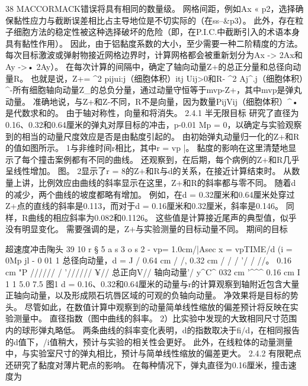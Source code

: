 \documentclass[UTF8,11pt,a4paper,openany,fontset=fandol]{ctexbook}
\begin{document}
38 MACCORMACK错误将具有相同的数量级。 网格间距，例如Ax « p2，选择确保黏性应力与截断误差相比占主导地位是不切实际的（在ss--\&p3）。 此外，存在粒子细胞方法的稳定性被这种选择破坏的危险（即，在P.I.C.中截断引入的术语本身具有黏性作用）。 因此，由于铝黏度系数的大小，至少需要一种二阶精度的方法。 每次目标激波或弹射物接近网格边界时，计算网格都会被重新划分为Ax -> 2Ax和Ay ->• 2Ay）。 在每次计算的间隔中，确定了轴向动量Z+的总正分量和总径向动量R。 也就是说，Z+= \textasciicircum{}2 pijui:j（细胞体积）itj Uij>0和R- \textasciicircum{}2 Aj\textasciicircum{}.j（细胞体积）\textasciicircum{}-所有细胞轴向动量Z\_的总负分量，通过动量守恒等于mvp-Z+，其中mvp是弹丸动量。 准确地说，与Z+和Z-不同，R不是向量，因为数量PijVij（细胞体积）\textasciicircum{}•是代数求和的。 由于轴对称性，向量和将消失。 2.4.1 半无限目标 研究了直径为0.16、0.32和0.64厘米的弹丸对厚目标的冲击，p-0.01 Mp = 0，以确定与实验观察到的相当的动量尺度效应是否是由黏度引起的。 由初始弹丸动量归一化的Z+和R的值如图所示。 1与非维时间r相比，其中r = vp |。 黏度的影响在这里清楚地显示了每个撞击案例都有不同的曲线。 还观察到，在后期，每个病例的Z+和R几乎呈线性增加。 图。 2显示了r = 8的Z+和R与d的关系，在接近计算结束时。 从数量上讲，比例效应由曲线的斜率显示在这里，Z+和R的斜率都与零不同。 随着d的减少，两个曲线的坡度都略有增加。 例如，在d = 0.32厘米和0.64厘米处穿过Z+点的直线的斜率是0.113，而对于d = 0.16厘米和0.32厘米，斜率是0.146。 同样，R曲线的相应斜率为0.082和0.1126。 这些值是计算接近尾声的典型值，似乎没有明显变化。 需要强调的是，Z+与实验测量的目标动量不同。 期间的目标

超速度冲击陱头 39 10 r § 5 a s 3 o s 2 - vp= 1.0cm/|Asec x = vpTIME/d (i = 0Mp jl - 0 01 1 总径向动量，d = J / 0.64 cm / /, 0.32 cm / / / '/ / //。 0.16 cm "P ////// / '////// ¥// 总正向V// 轴向动量'/ y\textasciicircum{}C\textasciicircum{} 032 cm '\textasciicircum{}\textasciicircum{}\textasciicircum{} 0.16 cm I 1 1 5.0 7.5 图1 d = 0.16、0.32和0.64厘米的动量与r的计算观察到轴附近包含大量正轴向动量，以及形成陨石坑唇区域的可观的负轴向动量。 净效果将是目标的势头。 尽管如此，在数值计算中观察到的动量简单线性缩放的偏差预计将反映在实验测量中。 直径指数（图中曲线的斜率。 2）比实验中发现的大致相同尺寸范围内的球形弹丸略低。 两条曲线的斜率变化表明，d的指数取决于fi/d，在相同报告的d值下，/i值稍大，预计与实验的相关性会更好。 此外，在线粒体的动量测量中，与实验室尺寸的弹丸相比，预计与简单线性缩放的偏差更大。 2.4.2 有限靶点 还研究了黏度对薄片靶点的影响。 在每种情况下，弹丸直径为0.16厘米，撞击速度为
\end{document}
